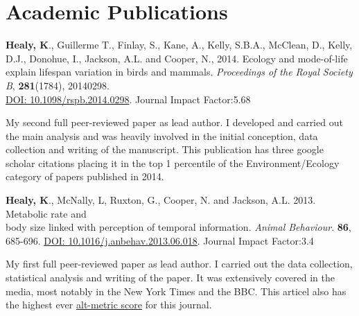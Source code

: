 \documentclass[10pt,a4paper]{article}
\begin{document}
\section{Academic Publications}
\begin{flushleft}
\textbf{Healy, K}., Guillerme T., Finlay, S., Kane, A., Kelly, S.B.A., McClean, D., Kelly, D.J., Donohue, I., Jackson, A.L. and Cooper, N., 2014. Ecology and mode-of-life explain lifespan variation in birds and mammals. \textit{Proceedings of the Royal Society B}, \textbf{281}(1784), 20140298.\\ \href{http://rspb.royalsocietypublishing.org/content/281/1784/20140298.full.pdf?keytype=ref&ijkey=gPt28ElSAYBvRhZ}{DOI: 10.1098/rspb.2014.0298}. Journal Impact Factor:5.68
\smallskip
\par{\fontsize{10.5}{10}\selectfont My second full peer-reviewed paper as lead author. I developed and carried out the main analysis and was heavily involved in the initial conception, data collection and writing of the manuscript. This publication has three google scholar citations placing it in the top 1 percentile of the Environment/Ecology category of papers published in 2014.}

\bigskip

\textbf{Healy, K}., McNally, L, Ruxton, G., Cooper, N. and Jackson, A.L. 2013. Metabolic rate and\\
body size linked with perception of temporal information.  \textit{Animal Behaviour}. \textbf{86}, 685-696. \href{http://dx.doi.org/10.1016/j.anbehav.2013.06.018}{DOI: 10.1016/j.anbehav.2013.06.018}. Journal Impact Factor:3.4
\smallskip
\par{\fontsize{10.5}{10}\selectfont My first full peer-reviewed paper as lead author. I carried out the data collection, statistical analysis and writing of the paper. It was extensively covered in the media, most notably in the New York Times and the BBC. This articel also has the highest ever \href{http://www.altmetric.com/details.php?key=517059da36b98ab7d4941284da32e5f7&citation_id=1705703&embedded=true}{alt-metric score} for this journal.} %

\bigskip


\end{flushleft}
\end{document}
